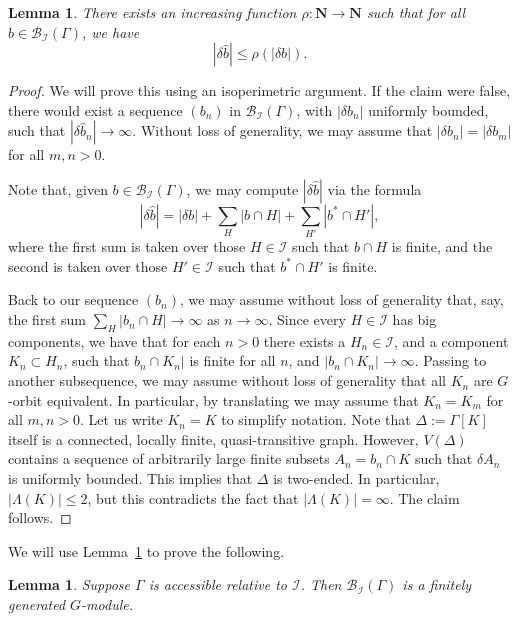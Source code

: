 \documentclass[11pt,a4paper]{amsart}
\newcommand{\N}{\mathbf{N}}
\newtheorem{lemma}[theorem]{Lemma}
\theoremstyle{definition}
\newcommand{\br}{{\mathscr{B}}}
\begin{document}
 \begin{lemma}\label{claim:coboundary-control}
        There exists an increasing function $\rho : \N \to \N$ such that for all $b \in \br_{\mathcal I}(\Gamma)$, we have
        $$
         |\delta \widehat b| \leq \rho(|\delta b| ).
        $$
    \end{lemma}

    \begin{proof}
        We will prove this using an isoperimetric argument.
        If the claim were false, there would exist a sequence $(b_n)$ in $\br_{\mathcal I}(\Gamma)$, with $|\delta b_n|$ uniformly bounded, such that $|\delta \widehat b_n| \to \infty$. Without loss of generality, we may assume that $|\delta b_n| = |\delta b_m|$ for all $m, n > 0$.

        Note that, given $b \in \br_{\mathcal I}(\Gamma)$, we may compute $|\delta \widehat b|$ via the formula
        $$
        |\delta \widehat b| = |\delta b| + \sum_H |b \cap H| + \sum_{H'} |b^\ast \cap H'|,
        $$
        where the first sum is taken over those $H \in \mathcal I$ such that $b \cap H$ is finite, and the second is taken over those $H' \in \mathcal I$ such that $b^\ast \cap H'$ is finite. 

        Back to our sequence $(b_n)$, we may assume without loss of generality that, say, the first sum $\sum_H |b_n \cap H| \to \infty$ as $n \to \infty$. Since every $H \in \mathcal I$ has big components, we have that for each $n > 0$ there exists a $H_n \in \mathcal I$, and a component $K_n \subset H_n$, such that  $b_n \cap K_n|$ is finite for all $n$, and $|b_n \cap K_n| \to \infty$. Passing to another subsequence, we may assume without loss of generality that all $K_n$ are $G$-orbit equivalent. In particular, by translating we may assume that $K_n = K_m$ for all $m,n > 0$. Let us write $K_n = K$ to simplify notation. Note that $\Delta := \Gamma[K]$ itself is a connected, locally finite, quasi-transitive graph. However, $V(\Delta)$ contains a sequence of arbitrarily large finite subsets $A_n = b_n \cap K$ such that $\delta A_n$ is uniformly bounded. This implies that $\Delta$ is two-ended. In particular, $|\Lambda(K)| \leq 2$, but this contradicts the fact that $|\Lambda(K)| =\infty$. The claim follows.
    \end{proof}
    
    
    We will use Lemma~\ref{claim:coboundary-control} to prove the following.

    \begin{lemma}\label{claim:inf-ended-case}
        Suppose $\Gamma$ is accessible relative to $\mathcal I$. Then $\br_{\mathcal I}(\Gamma)$ is a finitely generated $G$-module.
    \end{lemma}
\end{document}
